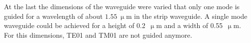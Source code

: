\begin{figure}
\caption{}%
\label{fig:3TE}%
\end{figure}


At the last the dimensions of the waveguide were varied that only one mode is guided for a wavelength of about $1.55~\upmu$m in the strip waveguide. A single mode waveguide could be achieved for a height of 0.2~$\upmu$m and a width of 0.55~$\upmu$m. For this dimensions, TE01 and TM01 are not guided anymore.
